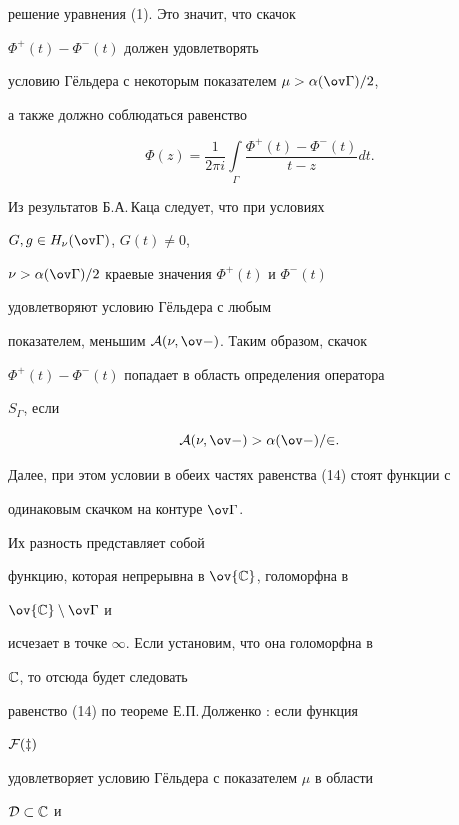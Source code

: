 решение уравнения (1). Это значит, что скачок


$\Phi^+(t)-\Phi^-(t)$ должен удовлетворять


условию Г\"ельдера с некоторым показателем $\mu>\alpha(\ov\Gamma)/2$,


а также должно соблюдаться равенство


\begin{equation}


\Phi(z)=\frac{1}{2\pi i}\int\limits_\Gamma


\frac{\Phi^+(t)-\Phi^-(t)}{t-z}dt.


\end{equation}


Из результатов Б.А.\,Каца \cite{11} следует, что при условиях


$G,g\in H_\nu(\ov\Gamma)$, $G(t)\ne 0$,


$\nu>\alpha(\ov\Gamma)/2$ краевые значения $\Phi^+(t)$ и $\Phi^-(t)$


удовлетворяют условию Г\"ельдера с любым


показателем, меньшим $\cal A(\nu,\ov\Gamma)$. Таким образом, скачок


$\Phi^+(t)-\Phi^-(t)$ попадает в область определения оператора


$S_\Gamma$, если


\begin{equation}


\cal A(\nu,\ov\Gamma)>\alpha(\ov\Gamma)/2.


\end{equation}


Далее, при этом условии в обеих частях равенства (14) стоят функции с


одинаковым скачком на контуре $\ov\Gamma$.


Их разность представляет собой


функцию, которая непрерывна в $\ov{\Bbb C}$, голоморфна в


$\ov{\Bbb C}\setminus\ov\Gamma$ и


исчезает в точке $\infty$. Если установим, что она голоморфна в


$\Bbb C$, то отсюда будет следовать


равенство (14) по теореме Е.П.\,Долженко \cite{17}: если функция


$\cal F(z)$


удовлетворяет условию Г\"ельдера с показателем $\mu$ в области


$\cal D\subset\Bbb C$ и


